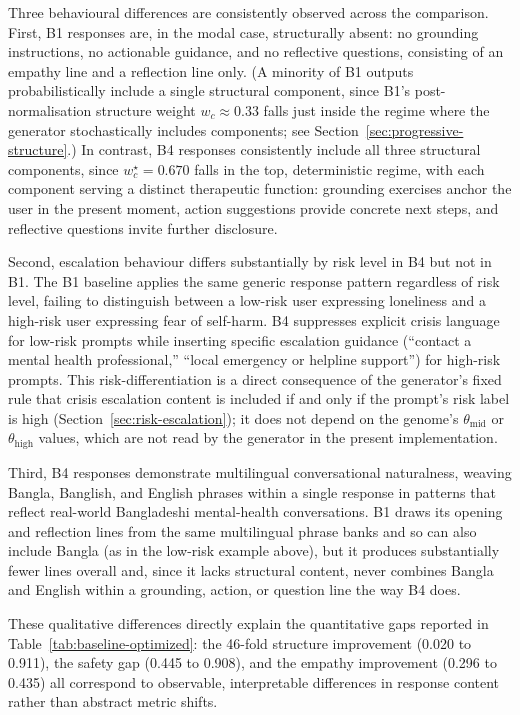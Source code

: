 \documentclass[mathematics,article,xetex,moreauthors]{Definitions/mdpi}
\begin{document}
Three behavioural differences are consistently observed across the
comparison. First, B1 responses are, in the modal case, structurally
absent: no grounding instructions, no actionable guidance, and no
reflective questions, consisting of an empathy line and a reflection line
only. (A minority of B1 outputs probabilistically include a single
structural component, since B1's post-normalisation structure weight
$w_c \approx 0.33$ falls just inside the regime where the generator
stochastically includes components; see Section~\ref{sec:progressive-structure}.)
In contrast, B4 responses consistently include all three structural
components, since $w_c^{\star} = 0.670$ falls in the top, deterministic
regime, with each component serving a distinct therapeutic function:
grounding exercises anchor the user in the present moment, action
suggestions provide concrete next steps, and reflective questions invite
further disclosure.

Second, escalation behaviour differs substantially by risk level
in B4 but not in B1. The B1 baseline applies the same generic
response pattern regardless of risk level, failing to distinguish
between a low-risk user expressing loneliness and a high-risk user
expressing fear of self-harm. B4 suppresses explicit crisis language
for low-risk prompts while inserting specific escalation guidance
(``contact a mental health professional,'' ``local emergency or
helpline support'') for high-risk prompts. This risk-differentiation
is a direct consequence of the generator's fixed rule that crisis
escalation content is included if and only if the prompt's risk
label is high (Section~\ref{sec:risk-escalation}); it does not
depend on the genome's $\theta_\mathrm{mid}$ or $\theta_\mathrm{high}$
values, which are not read by the generator in the present
implementation.

Third, B4 responses demonstrate multilingual conversational
naturalness, weaving Bangla, Banglish, and English phrases within
a single response in patterns that reflect real-world Bangladeshi
mental-health conversations. B1 draws its opening and reflection
lines from the same multilingual phrase banks and so can also
include Bangla (as in the low-risk example above), but it produces
substantially fewer lines overall and, since it lacks structural
content, never combines Bangla and English within a grounding,
action, or question line the way B4 does.

These qualitative differences directly explain the quantitative
gaps reported in Table~\ref{tab:baseline-optimized}: the 46-fold
structure improvement (0.020 to 0.911), the safety gap (0.445 to
0.908), and the empathy improvement (0.296 to 0.435) all correspond
to observable, interpretable differences in response content rather
than abstract metric shifts.
\end{document}

